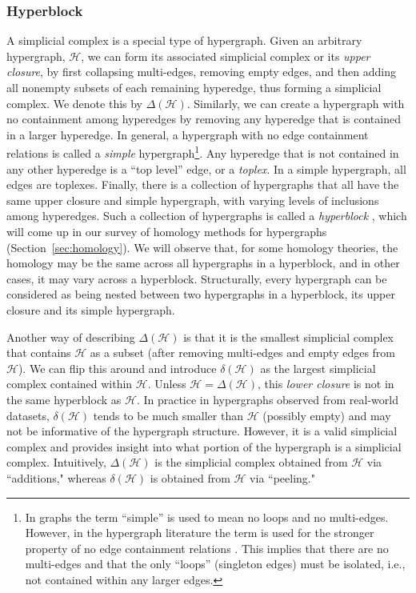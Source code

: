 \documentclass{amsart}
\renewcommand{\H}{\mathcal{H}}
\begin{document}
\subsubsection{Hyperblock}
A simplicial complex is a special type of hypergraph.
Given an arbitrary hypergraph, $\H$, we can form its associated simplicial complex or its \emph{upper closure}, by first collapsing multi-edges, removing empty edges, and then adding all nonempty subsets of each remaining hyperedge, thus forming a simplicial complex. We denote this by $\Delta(\H)$.
Similarly, we can create a hypergraph with no containment among hyperedges by removing any hyperedge that is contained in a larger hyperedge.
In general, a hypergraph with no edge containment relations is called a \emph{simple} hypergraph\footnote{In graphs the term ``simple'' is used to mean no loops and no multi-edges. However, in the hypergraph literature the term is used for the stronger property of no edge containment relations \cite{berge1984hypergraphs,joslyn2020hypernetwork}. This implies that there are no multi-edges and that the only ``loops'' (singleton edges) must be isolated, i.e., not contained within any larger edges.}.
Any hyperedge that is not contained in any other hyperedge is a ``top level'' edge, or a \emph{toplex}.
In a simple hypergraph, all edges are toplexes.
Finally, there is a collection of hypergraphs that all have the same upper closure and simple hypergraph, with varying levels of inclusions among hyperedges.
Such a collection of hypergraphs is called a \emph{hyperblock} \cite[page 5]{joslyn2020hypernetwork}, which will come up in our survey of homology methods for hypergraphs (Section~\ref{sec:homology}).
We will observe that, for some homology theories, the homology may be the same across all hypergraphs in a hyperblock, and in other cases, it may vary across a hyperblock.
Structurally, every hypergraph can be considered as being nested between two hypergraphs in a hyperblock, its upper closure and its simple hypergraph.

Another way of describing $\Delta(\H)$ is that it is the smallest simplicial complex that contains $\H$ as a subset (after removing multi-edges and empty edges from $\H$). We can flip this around and introduce $\delta(\H)$ as the largest simplicial complex contained within $\H$. Unless $\H = \Delta(\H)$, this \emph{lower closure} is not in the same hyperblock as $\H$. In practice in hypergraphs observed from real-world datasets, $\delta(\H)$ tends to be much smaller than $\H$ (possibly empty) and may not be informative of the hypergraph structure. However, it is a valid simplicial complex and provides insight into what portion of the hypergraph is a simplicial complex. Intuitively, $\Delta(\H)$ is the simplicial complex obtained from $\H$ via ``additions," whereas $\delta(\H)$ is obtained from $\H$ via ``peeling."
\end{document}
